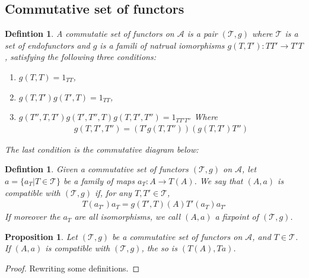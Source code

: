 \documentclass[12pt]{article}
\newcounter{the}
\newtheorem{proposition}[the]{Proposition}
\newtheorem{definition}[the]{Defintion}
\begin{document}
\subsection*{Commutative set of functors}
\begin{definition}
    A commutatie set of functors on $\mathscr A$ is a pair $(\mathscr T, g)$ where $\mathscr T$ is a set of endofunctors and $g$ is a famili of natrual iomorphisms $g(T, T'): TT' \to T'T$, satisfying the following three conditions:
    \begin{enumerate}
        \item $g(T, T) = 1_{TT}$,
        \item $g(T, T') g(T', T) = 1_{TT}$,
        \item $g(T'', T, T') g(T', T'', T) g(T, T', T'') = 1_{TT'T''}$ 
            Where 
            \begin{gather*}
                g(T, T', T'') = (T' g(T, T''))(g(T, T')T'')
            \end{gather*}
    \end{enumerate}
    The last condition is the commutative diagram below:
    \begin{center}
    \end{center}
\end{definition}


\begin{definition}
    Given a commutative set of functors $(\mathscr T, g)$ on $\mathscr A$, let $a = \{a_T | T \in \mathscr T \}$ be a family of maps $a_T: A \to T(A)$. We say that $(A, a)$ is compatible with $(\mathscr{T}, g)$ if, for any $T, T' \in \mathscr T$,
    \begin{gather*}
        T(a_{T'}) a_T = g(T', T) (A) T' (a_T) a_{T'}
    \end{gather*}
    If moreover the $a_T$ are all isomorphisms, we call $(A, a)$ a fixpoint of $(\mathscr T, g)$.
\end{definition}

\begin{proposition}
    Let $(\mathscr T, g)$ be a commutative set of functors on $\mathscr A$, and $T \in \mathscr T$. If $(A, a)$ is compatible with $(\mathscr T, g)$, the so is $(T(A), T a)$.
\end{proposition}
\begin{proof}
    Rewriting some definitions.
\end{proof}
\end{document}
